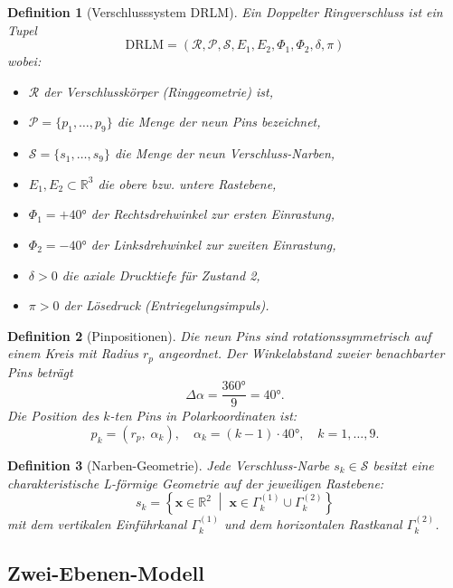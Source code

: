 ﻿\documentclass[12pt, a4paper]{article}
\newtheorem{definition}{Definition}[section]
\theoremstyle{remark}
\newcommand{\Pin}{\mathcal{P}}
\newcommand{\Scar}{\mathcal{S}}
\newcommand{\Ring}{\mathcal{R}}
\newcommand{\vvec}[1]{\boldsymbol{#1}}
\begin{document}
\begin{definition}[Verschlusssystem DRLM]
  Ein \emph{Doppelter Ringverschluss} ist ein Tupel
  \[
    \text{DRLM} = (\Ring, \Pin, \Scar, E_1, E_2, \Phi_1, \Phi_2, \delta, \pi)
  \]
  wobei:
  \begin{itemize}[noitemsep]
    \item $\Ring$ der Verschlusskörper (Ringgeometrie) ist,
    \item $\Pin = \{p_1, \ldots, p_9\}$ die Menge der neun Pins bezeichnet,
    \item $\Scar = \{s_1, \ldots, s_9\}$ die Menge der neun Verschluss-Narben,
    \item $E_1, E_2 \subset \mathbb{R}^3$ die obere bzw. untere Rastebene,
    \item $\Phi_1 = +40 °$ der Rechtsdrehwinkel zur ersten Einrastung,
    \item $\Phi_2 = -40 °$ der Linksdrehwinkel zur zweiten Einrastung,
    \item $\delta > 0$ die axiale Drucktiefe für Zustand 2,
    \item $\pi > 0$ der Lösedruck (Entriegelungsimpuls).
  \end{itemize}
\end{definition}

\begin{definition}[Pinpositionen]
  Die neun Pins sind rotationssymmetrisch auf einem Kreis mit Radius $r_p$ angeordnet.
  Der Winkelabstand zweier benachbarter Pins beträgt
  \[
    \Delta\alpha = \frac{360 °}{9} = 40 °.
  \]
  Die Position des $k$-ten Pins in Polarkoordinaten ist:
  \[
    p_k = \left(r_p,\; \alpha_k\right), \quad \alpha_k = (k-1) \cdot 40 °, \quad k = 1, \ldots, 9.
  \]
\end{definition}

\begin{definition}[Narben-Geometrie]
  Jede Verschluss-Narbe $s_k \in \Scar$ besitzt eine charakteristische L-förmige Geometrie
  auf der jeweiligen Rastebene:
  \[
    s_k = \left\{ \vvec{x} \in \mathbb{R}^2 \;\middle|\; \vvec{x} \in \Gamma_k^{(1)} \cup \Gamma_k^{(2)} \right\}
  \]
  mit dem vertikalen Einführkanal $\Gamma_k^{(1)}$ und dem horizontalen Rastkanal $\Gamma_k^{(2)}$.
\end{definition}

\subsection{Zwei-Ebenen-Modell}
\end{document}
